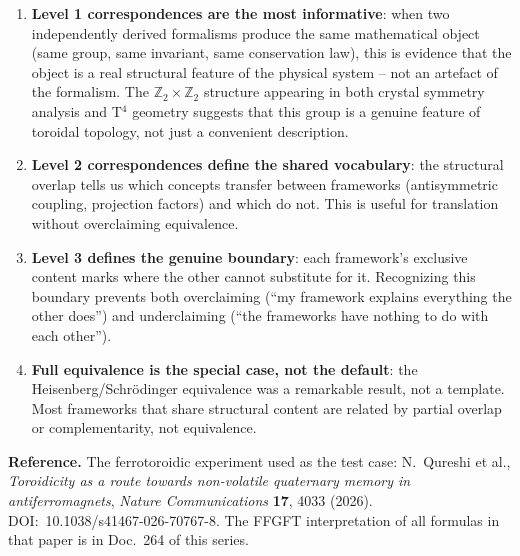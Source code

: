 \begin{enumerate}
  \item \textbf{Level 1 correspondences are the most informative}: when two
        independently derived formalisms produce the same mathematical object
        (same group, same invariant, same conservation law), this is evidence
        that the object is a real structural feature of the physical system --
        not an artefact of the formalism. The $\mathbb{Z}_2\times\mathbb{Z}_2$
        structure appearing in both crystal symmetry analysis and T$^4$
        geometry suggests that this group is a genuine feature of toroidal
        topology, not just a convenient description.
  \item \textbf{Level 2 correspondences define the shared vocabulary}: the
        structural overlap tells us which concepts transfer between frameworks
        (antisymmetric coupling, projection factors) and which do not. This
        is useful for translation without overclaiming equivalence.
  \item \textbf{Level 3 defines the genuine boundary}: each framework's
        exclusive content marks where the other cannot substitute for it.
        Recognizing this boundary prevents both overclaiming (``my framework
        explains everything the other does'') and underclaiming (``the
        frameworks have nothing to do with each other'').
  \item \textbf{Full equivalence is the special case, not the default}: the
        Heisenberg/Schrödinger equivalence was a remarkable result, not a
        template. Most frameworks that share structural content are related by
        partial overlap or complementarity, not equivalence.
\end{enumerate}

\noindent\textbf{Reference.} The ferrotoroidic experiment used as the test
case: N.~Qureshi et al., \textit{Toroidicity as a route towards non-volatile
quaternary memory in antiferromagnets}, \textit{Nature Communications}
\textbf{17}, 4033 (2026). DOI:~10.1038/s41467-026-70767-8. The FFGFT
interpretation of all formulas in that paper is in Doc.~264 of this series.
